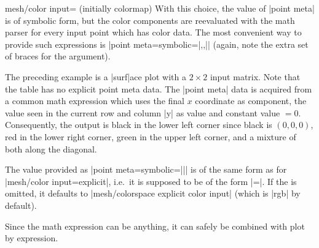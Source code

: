 {{\begin{pgfplotskey}{mesh/color input= (initially colormap)}
With this choice, the value of |point meta| is of symbolic form, but the color components are reevaluated with the math parser for every input point which has color data. The most convenient way to provide such expressions is |point meta={symbolic={|,,|}}| (again, note the extra set of braces for the argument). 

\begin{codeexample}[]
\end{codeexample}
\noindent The preceding example is a |surf|ace plot with a $2 \times 2$ input matrix. Note that the table has no explicit point meta data. The |point meta| data is acquired from a common math expression which uses the final $x$ coordinate as  component, the value seen in the current row and column |y| as  value and constant value $=0$. Consequently, the output is black in the lower left corner since black is $(0,0,0)$, red in the lower right corner, green in the upper left corner, and a mixture of both along the diagonal.

The value provided as |point meta={symbolic=||}| is of the same form as for |mesh/color input=explicit|, i.e.\ it is supposed to be of the form |=|. If the  is omitted, it defaults to |mesh/colorspace explicit color input| (which is |rgb| by default).

Since the math expression can be anything, it can safely be combined with plot by expression.


\end{pgfplotskey}}}
